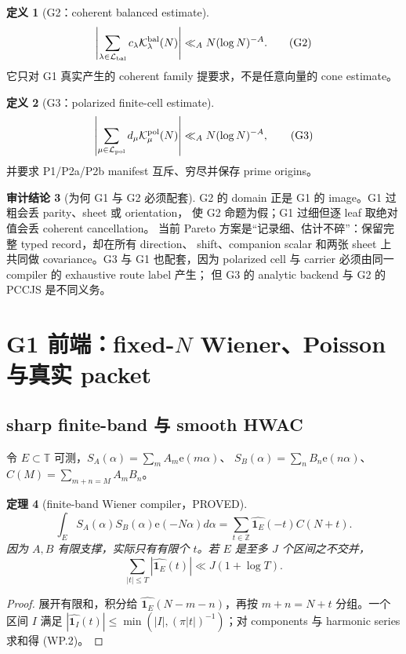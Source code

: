 \documentclass[11pt,a4paper]{ctexart}
\newtheorem{theorem}{定理}[section]
\theoremstyle{definition}
\newtheorem{definition}[theorem]{定义}
\newtheorem{audit}[theorem]{审计结论}
\newcommand{\e}{\mathrm e}
\newcommand{\1}{\mathbf 1}
\newcommand{\T}{\mathbb T}
\newcommand{\PROVED}{\textcolor{green!40!black}{\textsf{PROVED}}}
\begin{document}
\begin{definition}[G2：coherent balanced estimate]
\[
 \left|\sum_{\lambda\in\mathcal L_{\rm bal}}c_\lambda
 \mathcal K_\lambda^{\rm bal}(N)\right|
 \ll_A N(\log N)^{-A}.                               \tag{G2}
\]
它只对 G1 真实产生的 coherent family 提要求，不是任意向量的 cone estimate。
\end{definition}

\begin{definition}[G3：polarized finite-cell estimate]
\[
 \left|\sum_{\mu\in\mathcal L_{\rm pol}}d_\mu
 \mathcal K_\mu^{\rm pol}(N)\right|
 \ll_A N(\log N)^{-A},                               \tag{G3}
\]
并要求 P1/P2a/P2b manifest 互斥、穷尽并保存 prime origins。
\end{definition}

\begin{audit}[为何 G1 与 G2 必须配套]
G2 的 domain 正是 G1 的 image。G1 过粗会丢 parity、sheet 或 orientation，
使 G2 命题为假；G1 过细但逐 leaf 取绝对值会丢 coherent cancellation。
当前 Pareto 方案是“记录细、估计不碎”：保留完整 typed record，却在所有 direction、
shift、companion scalar 和两张 sheet 上共同做 covariance。G3 与 G1 也配套，因为
polarized cell 与 carrier 必须由同一 compiler 的 exhaustive route label 产生；
但 G3 的 analytic backend 与 G2 的 PCCJS 是不同义务。
\end{audit}

\section{G1 前端：fixed-$N$ Wiener、Poisson 与真实 packet}
\label{sec:g1front}

\subsection{sharp finite-band 与 smooth HWAC}

令 $E\subset\T$ 可测，$S_A(\alpha)=\sum_mA_m\e(m\alpha)$、
$S_B(\alpha)=\sum_nB_n\e(n\alpha)$、
$C(M)=\sum_{m+n=M}A_mB_n$。

\begin{theorem}[finite-band Wiener compiler，\PROVED]
\[
 \boxed{\int_E S_A(\alpha)S_B(\alpha)\e(-N\alpha)d\alpha
 =\sum_{t\in\mathbb Z}\widehat{\1_E}(-t)C(N+t).}    \tag{WP.1}
\]
因为 $A,B$ 有限支撑，实际只有有限个 $t$。若 $E$ 是至多 $J$ 个区间之不交并，
\[
 \sum_{|t|\le T}|\widehat{\1_E}(t)|\ll J(1+\log T).\tag{WP.2}
\]
\end{theorem}
\begin{proof}
展开有限和，积分给
$\widehat{\1_E}(N-m-n)$，再按 $m+n=N+t$ 分组。一个区间 $I$ 满足
$|\widehat{\1_I}(t)|\le\min(|I|,(\pi|t|)^{-1})$；对 components 与 harmonic
series 求和得 (WP.2)。
\end{proof}
\end{document}
